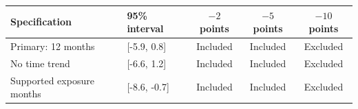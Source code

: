 \begin{tabular}{llccc}
\toprule
Specification & 95\% interval & $-2$ points & $-5$ points & $-10$ points \\
\midrule
Primary: 12 months & [-5.9, 0.8] & Included & Included & Excluded \\
No time trend & [-6.6, 1.2] & Included & Included & Excluded \\
Supported exposure months & [-8.6, -0.7] & Included & Included & Excluded \\
\bottomrule
\end{tabular}
